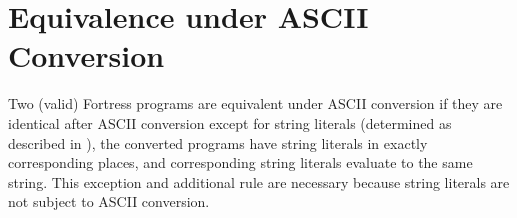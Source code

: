 \section{Equivalence under ASCII Conversion}

Two (valid) Fortress programs are equivalent under ASCII conversion
if they are identical after ASCII conversion
except for string literals
(determined as described in ),
the converted programs have string literals
in exactly corresponding places,
and corresponding string literals evaluate to the same string.
This exception and additional rule
are necessary because string literals
are not subject to ASCII conversion.
